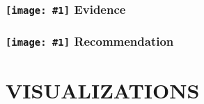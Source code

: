 \documentclass[12p]{article}
\newcommand{\icon}[1]{\texttt{[image: \#1]}}
\begin{document}
\subsubsection*{\protect\icon{/home/miki/Documents/GITHUB/AndroidPermissions/python/vulns/report_icons/basic_magnifier.png} Evidence}

\subsubsection*{\protect\icon{/home/miki/Documents/GITHUB/AndroidPermissions/python/vulns/report_icons/basic_todo.png} Recommendation}

\cleardoublepage
\newpage
\section{VISUALIZATIONS}
\end{document}
